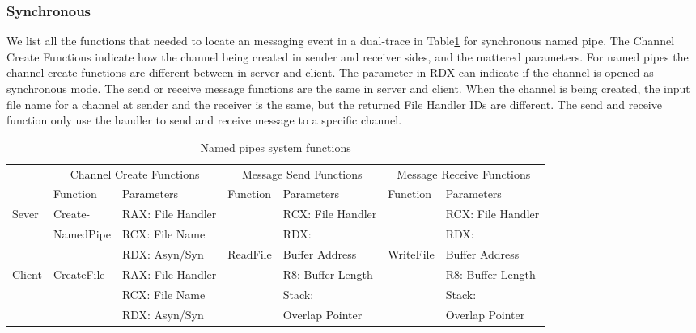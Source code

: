 \documentclass[paper=a4, fontsize=11pt]{scrartcl}
\numberwithin{equation}{section}		%
\numberwithin{figure}{section}			%
\numberwithin{table}{section}				%
\begin{document}
\subsubsection{Synchronous}
We list all the functions that needed to locate an messaging event in a dual-trace in Table\ref{synfunctions} for synchronous named pipe. The Channel Create Functions indicate how the channel being created in sender and receiver sides, and the mattered parameters. For named pipes the channel create functions are different between in server and client. The parameter in RDX can indicate if the channel is opened as synchronous mode. The send or receive message functions are the same in server and client. When the channel is being created, the input file name for a channel at sender and the receiver is the same, but the returned File Handler IDs are different. The send and receive function only use the handler to send and receive message to a specific channel. 
\begin{table}[h]
        \centering
        \caption{Named pipes system functions}
        \label{synfunctions}
        \begin{tabular}{|l|l|l|l|l|l|l|}
            \hline
             \multirow{2}{*}{} &
               \multicolumn{2}{c|}{Channel Create Functions} &
               \multicolumn{2}{c|}{Message Send Functions} &
               \multicolumn{2}{c|}{Message Receive Functions} \\
             \cline{2-7}
              & Function& Parameters & Function & Parameters  & Function & Parameters\\
             \hline
             Sever& Create-&  RAX: File Handler &  &  RCX: File Handler &&RCX: File Handler\\
             \cline{3-3} \cline{5-5} \cline{7-7}
             &NamedPipe&RCX: File Name && RDX:  &&RDX: \\
              \cline{3-3} 
             &&RDX: Asyn/Syn&ReadFile& Buffer Address &WriteFile&Buffer Address\\
                \cline{1-3} \cline{5-5} \cline{7-7}
             Client & CreateFile & RAX: File Handler & &  R8: Buffer Length &&R8: Buffer Length\\
              \cline{3-3} \cline{5-5} \cline{7-7}
             &&RCX: File Name &&Stack:&&Stack:\\
             \cline{3-3} 
             &&RDX: Asyn/Syn&& Overlap Pointer&&Overlap Pointer\\
            \hline
        \end{tabular}
    \end{table}
\end{document}
